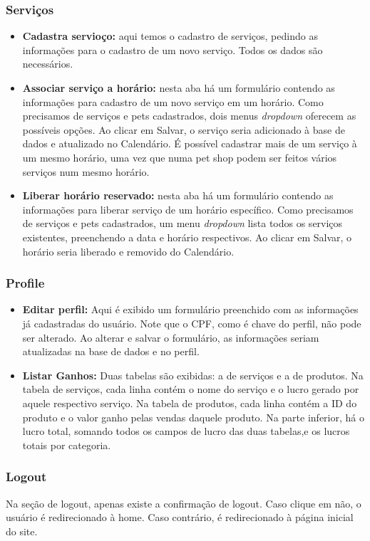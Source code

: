 \documentclass[10pt,a4paper]{article}
\begin{document}
\subsubsection{Serviços}
\begin{itemize}
\item \textbf{Cadastra servioço:} aqui temos o cadastro de serviços, pedindo as informações para o cadastro de um novo serviço. Todos os dados são necessários.
\item \textbf{Associar serviço a horário:} nesta aba há um formulário contendo as informações para cadastro de um novo serviço em um horário. Como precisamos de serviços e pets cadastrados, dois menus \textit{dropdown} oferecem as possíveis opções. Ao clicar em Salvar, o serviço seria adicionado à base de dados e atualizado no Calendário. É possível cadastrar mais de um serviço à um mesmo horário, uma vez que numa pet shop podem ser feitos vários serviços num mesmo horário.
\item \textbf{Liberar horário reservado: } nesta aba há um formulário contendo as informações para liberar serviço de um horário específico. Como precisamos de serviços e pets cadastrados, um menu \textit{dropdown} lista todos os serviços existentes, preenchendo a data e horário respectivos. Ao clicar em Salvar, o horário seria liberado e removido do Calendário.
\end{itemize}
\subsubsection{Profile}
\begin{itemize}
\item \textbf{Editar perfil:} Aqui é exibido um formulário preenchido com as informações já cadastradas do usuário. Note que o CPF, como é chave do perfil, não pode ser alterado. Ao alterar e salvar o formulário, as informações seriam atualizadas na base de dados e no perfil.
\item \textbf{Listar Ganhos:} Duas tabelas são exibidas: a de serviços e a de produtos. Na tabela de serviços, cada linha contém o nome do serviço e o lucro gerado por aquele respectivo serviço. Na tabela de produtos, cada linha contém a ID do produto e o valor ganho pelas vendas daquele produto. Na parte inferior, há o lucro total, somando todos os campos de lucro das duas tabelas,e os lucros totais por categoria.
\end{itemize}
\subsubsection{Logout}
Na seção de logout, apenas existe a confirmação de logout. Caso clique em não, o usuário é redirecionado à home. Caso contrário, é redirecionado à página inicial do site.
\newpage
\end{document}
